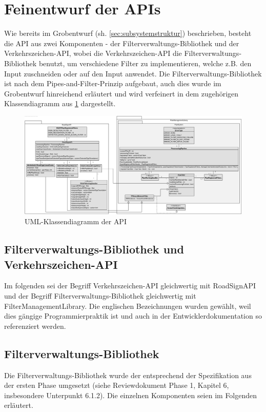 \documentclass[12pt,a4paper,ngerman,enabledeprecatedfontcommands]{scrreprt}
\begin{document}
\section{Feinentwurf der APIs}
Wie bereits im Grobentwurf (sh. \cref{sec:subsystemstruktur}) beschrieben, besteht die \gls{API} aus zwei Komponenten - der \gls{Filterverwaltungs-Bibliothek} und der \gls{Verkehrszeichen-API}, wobei die \gls{Verkehrszeichen-API} die \gls{Filterverwaltungs-Bibliothek} benutzt, um verschiedene Filter zu implementieren, welche z.B. den Input zuschneiden oder  auf den Input anwendet. Die \gls{Filterverwaltungs-Bibliothek} ist nach dem Pipes-and-Filter-Prinzip aufgebaut, auch dies wurde im Grobentwurf hinreichend erläutert und wird verfeinert in dem zugehörigen Klassendiagramm aus \cref{fig:klassen_api} dargestellt.\\

\begin{landscape}
\begin{figure}
\label{fig:klassen_api}
\centering
\includegraphics[width=1.08\linewidth]{Reviewdokument/Grafiken/api_class_diagram.png}
\caption{UML-Klassendiagramm der \gls{API}}
\end{figure}
\end{landscape}

\subsection{Filterverwaltungs-Bibliothek und Verkehrszeichen-API}
Im folgenden sei der Begriff \gls{Verkehrszeichen-API} gleichwertig mit RoadSignAPI und der Begriff \gls{Filterverwaltungs-Bibliothek} gleichwertig mit FilterManagementLibrary. Die englischen Bezeichnungen wurden gewählt, weil dies gängige Programmierpraktik ist und auch in der Entwicklerdokumentation so referenziert werden.\\


\subsection{Filterverwaltungs-Bibliothek}
Die Filterverwaltungs-Bibliothek wurde der entsprechend der Spezifikation aus der ersten Phase umgesetzt (siehe Reviewdokument Phase 1, Kapitel 6, insbesondere Unterpunkt 6.1.2).
Die einzelnen Komponenten seien im Folgenden erläutert.\\
\end{document}
